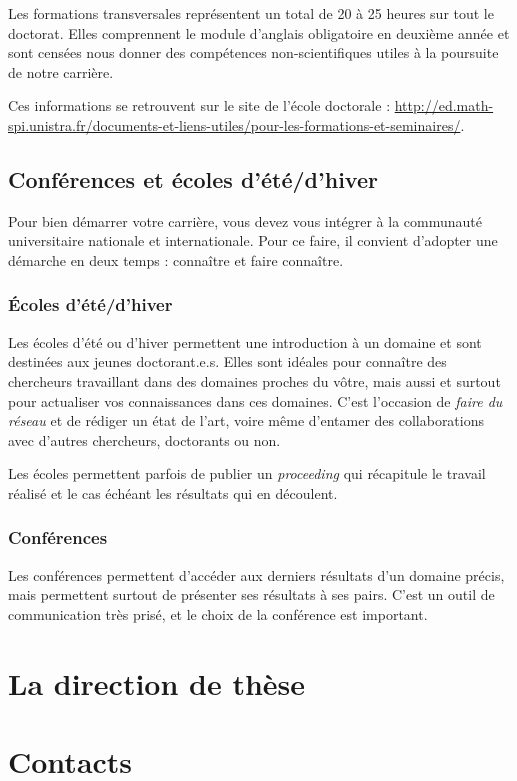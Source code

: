 \documentclass[a5paper]{article}
\begin{document}
Les formations transversales représentent un total de 20 à 25 heures sur tout le doctorat. Elles comprennent le module d'anglais obligatoire en deuxième année et sont censées nous donner des compétences non-scientifiques utiles à la poursuite de notre carrière.

\medskip

Ces informations se retrouvent sur le site de l'école doctorale : \href{http://ed.math-spi.unistra.fr/documents-et-liens-utiles/pour-les-formations-et-seminaires/}{http://ed.math-spi.unistra.fr/documents-et-liens-utiles/pour-les-formations-et-seminaires/}.

\subsection{Conférences et écoles d'été/d'hiver}
\label{subsec:conf-ecoledete}

Pour bien démarrer votre carrière, vous devez vous intégrer à la
communauté universitaire nationale et internationale. Pour ce faire, il convient d'adopter une démarche en deux temps : connaître et faire connaître.

\subsubsection{\'Ecoles d'été/d'hiver}
\label{subsubsec:ecoledete}

Les écoles d'été ou d'hiver permettent une introduction à un domaine
et sont destinées aux jeunes doctorant.e.s. Elles sont idéales pour connaître des chercheurs travaillant dans des domaines proches du vôtre, mais aussi et surtout pour actualiser vos connaissances dans ces domaines. C'est l'occasion de \textit{faire du réseau} et de rédiger un état de l'art, voire même d'entamer des collaborations avec d'autres chercheurs, doctorants ou non.

Les écoles permettent parfois de publier un \textit{proceeding} qui récapitule le travail réalisé et le cas échéant les résultats qui en découlent.

\subsubsection{Conférences}
\label{subsubsec:conf}

Les conférences permettent d'accéder aux derniers résultats d'un
domaine précis, mais permettent surtout de présenter ses résultats à
ses pairs. C'est un outil de communication très prisé, et le choix de
la conférence est important.

\section{La direction de thèse}
\label{sec:direction-these}

\appendix

\section{Contacts}
\label{sec:contacts}
\end{document}
